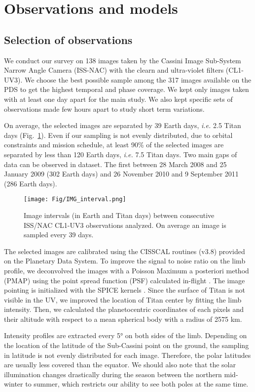 \section{Observations and models}

\subsection{Selection of observations}
We conduct our survey on 138 images taken by the Cassini Image Sub-System Narrow Angle Camera (ISS-NAC) with the
clearn and ultra-violet filters (CL1-UV3). We choose the best possible sample among the 317 images available on the PDS
to get the highest temporal and phase coverage. We kept only images taken with at least one day apart for the main study.
We also kept specific sets of observations made few hours apart to study short term variations.

On average, the selected images are separated by 39 Earth days, \textit{i.e.} 2.5 Titan days (Fig.~\ref{fig:img_sampling}).
Even if our sampling is not evenly distributed, due to orbital constraints and mission schedule, at least 90\% of the selected
images are separated by less than 120 Earth days, \textit{i.e.} 7.5 Titan days. Two main gaps of data can be observed in dataset.
The first between 28 March 2008 and 25 January 2009 (302 Earth days) and 26 November 2010 and 9 September 2011 (286 Earth days).

\begin{figure}[!ht]
\centering
\texttt{[image: Fig/IMG\_interval.png]}
\caption{Image intervals (in Earth and Titan days) between consecutive ISS/NAC CL1-UV3 observations analyzed. On average
an image is sampled every 39 days.}
\label{fig:img_sampling}
\end{figure}

The selected images are calibrated using the CISSCAL routines (v3.8) provided on the Planetary Data System. To improve
the signal to noise ratio on the limb profile, we deconvolved the images with a Poisson Maximum a posteriori method
(PMAP) using the point spread function (PSF) calculated in-flight \citep{West2010}. The image pointing is
initialized with the SPICE kernels \citep{Acton1996}. Since the surface of Titan is not visible in the UV, we improved
the location of Titan center by fitting the limb intensity. Then, we calculated the planetocentric coordinates of each
pixels and their altitude with respect to a mean spherical body with a radius of 2575 km.

Intensity profiles are extracted every \ang{5} on both sides of the limb. Depending on the location of the
latitude of the Sub-Cassini point on the ground, the sampling in latitude is not evenly distributed for each image.
Therefore, the polar latitudes are usually less covered than the equator.
We should also note that the solar illumination changes drastically during the
season between the northern mid-winter to summer, which restricts our ability to see both poles at the same time.


